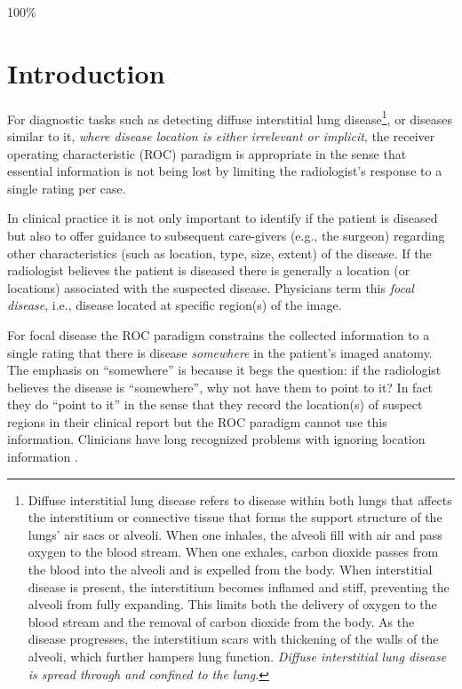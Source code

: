 \documentclass[
]{book}
\begin{document}
100\%

\hypertarget{froc-paradigm-intro}{%
\section{Introduction}\label{froc-paradigm-intro}}

For diagnostic tasks such as detecting diffuse interstitial lung disease\footnote{Diffuse interstitial lung disease refers to disease within both lungs that affects the interstitium or connective tissue that forms the support structure of the lungs' air sacs or alveoli. When one inhales, the alveoli fill with air and pass oxygen to the blood stream. When one exhales, carbon dioxide passes from the blood into the alveoli and is expelled from the body. When interstitial disease is present, the interstitium becomes inflamed and stiff, preventing the alveoli from fully expanding. This limits both the delivery of oxygen to the blood stream and the removal of carbon dioxide from the body. As the disease progresses, the interstitium scars with thickening of the walls of the alveoli, which further hampers lung function. \emph{Diffuse interstitial lung disease is spread through and confined to the lung}.}, or diseases similar to it, \emph{where disease location is either irrelevant or implicit}, the receiver operating characteristic (ROC) paradigm is appropriate in the sense that essential information is not being lost by limiting the radiologist's response to a single rating per case.

In clinical practice it is not only important to identify if the patient is diseased but also to offer guidance to subsequent care-givers (e.g., the surgeon) regarding other characteristics (such as location, type, size, extent) of the disease. If the radiologist believes the patient is diseased there is generally a location (or locations) associated with the suspected disease. Physicians term this \emph{focal disease}, i.e., disease located at specific region(s) of the image.

For focal disease the ROC paradigm constrains the collected information to a single rating that there is disease \emph{somewhere} in the patient's imaged anatomy. The emphasis on ``somewhere'' is because it begs the question: if the radiologist believes the disease is ``somewhere'', why not have them to point to it? In fact they do ``point to it'' in the sense that they record the location(s) of suspect regions in their clinical report but the ROC paradigm cannot use this information. Clinicians have long recognized problems with ignoring location information \citep{BlackDwyer1990, RN1921}.
\end{document}
